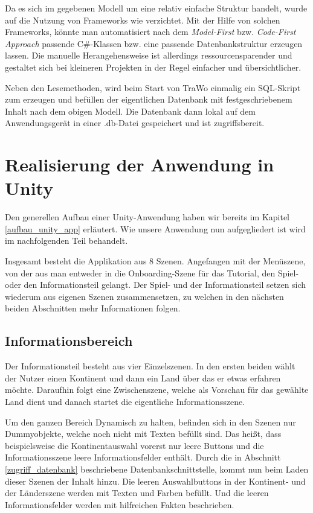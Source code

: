 Da es sich im gegebenen Modell um eine relativ einfache Struktur handelt, wurde auf die Nutzung von Frameworks wie  verzichtet. Mit der Hilfe von solchen Frameworks, könnte man automatisiert nach dem \textit{Model-First} bzw. \textit{Code-First Approach} passende C\#-Klassen bzw. eine passende Datenbankstruktur erzeugen lassen. Die manuelle Herangehensweise ist allerdings ressourcensparender und gestaltet sich bei kleineren Projekten in der Regel einfacher und übersichtlicher.

Neben den Lesemethoden, wird beim Start von TraWo einmalig ein SQL-Skript zum erzeugen und befüllen der eigentlichen Datenbank mit festgeschriebenem Inhalt nach dem obigen Modell. Die Datenbank dann lokal auf dem Anwendungsgerät in einer .db-Datei gespeichert und ist zugriffsbereit. 

\section{Realisierung der Anwendung in Unity}
Den generellen Aufbau einer Unity-Anwendung haben wir bereits im Kapitel \ref{aufbau_unity_app} erläutert.
Wie unsere Anwendung nun aufgegliedert ist wird im nachfolgenden Teil behandelt.

Insgesamt besteht die Applikation aus 8 Szenen. Angefangen mit der Menüszene, von der aus man entweder in die Onboarding-Szene für das Tutorial, den Spiel- oder den Informationsteil gelangt. 
Der Spiel- und der Informationsteil setzen sich wiederum aus eigenen Szenen zusammensetzen, zu welchen in den nächsten beiden Abschnitten mehr Informationen folgen. 

\subsection{Informationsbereich}
Der Informationsteil besteht aus vier Einzelszenen. 
In den ersten beiden wählt der Nutzer einen Kontinent und dann ein Land über das er etwas erfahren möchte.
Daraufhin folgt eine Zwischenszene, welche als Vorschau für das gewählte Land dient und danach startet die eigentliche Informationsszene. 

Um den ganzen Bereich Dynamisch zu halten, befinden sich in den Szenen nur Dummyobjekte, welche noch nicht mit Texten befüllt sind. Das heißt, dass beispielsweise die Kontinentauswahl vorerst nur leere Buttons und die Informationsszene leere Informationsfelder enthält.
Durch die in Abschnitt \ref{zugriff_datenbank} beschriebene Datenbankschnittstelle, kommt nun beim Laden dieser Szenen der Inhalt hinzu. 
Die leeren Auswahlbuttons in der Kontinent- und der Länderszene werden mit Texten und Farben befüllt. Und die leeren Informationsfelder werden mit hilfreichen Fakten beschrieben.


